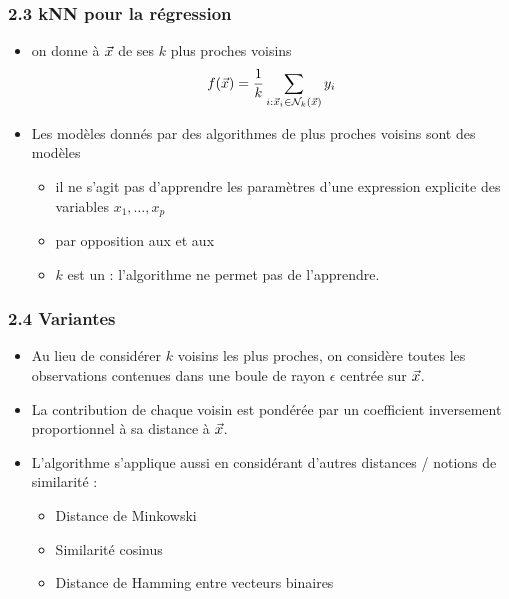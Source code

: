 \begin{frame}
  \frametitle{2.3 kNN pour la régression}
  \begin{itemize}
  \item {} on donne à $\vec{x}$ 
     de ses $k$ plus proches voisins
    \[ f(\vec{x}) = \frac1k \sum_{i : \vec{x}_i \in \mathcal{N}_k(\vec{x})} y_i \]
  \end{itemize}
  \pause
    \begin{itemize}
    \item {} Les modèles donnés par des algorithmes de plus
      proches voisins sont des modèles 
      \begin{itemize}
      \item il ne s'agit pas d'apprendre les paramètres d'une expression explicite des variables
        $x_1, \dots, x_p$
      \item par opposition aux  et aux 
      \item $k$ est un  : l'algorithme ne permet pas de l'apprendre.
      \end{itemize}
    \end{itemize}
\end{frame}

{
  \begin{frame}
    \frametitle{2.4 Variantes}
    \begin{itemize}
    \item {} Au lieu de considérer $k$ voisins les plus
      proches, on considère toutes les observations contenues dans une boule de
      rayon $\epsilon$ centrée sur $\vec{x}$.
    \item {} La contribution de chaque voisin est
      pondérée par un coefficient inversement proportionnel à sa distance à
      $\vec{x}$.
    \item {} L'algorithme s'applique aussi en considérant
      d'autres distances / notions de similarité :
      \begin{itemize}
      \item Distance de Minkowski
      \item Similarité cosinus
      \item Distance de Hamming entre vecteurs binaires
      \end{itemize}
    \end{itemize}
  \end{frame}}


